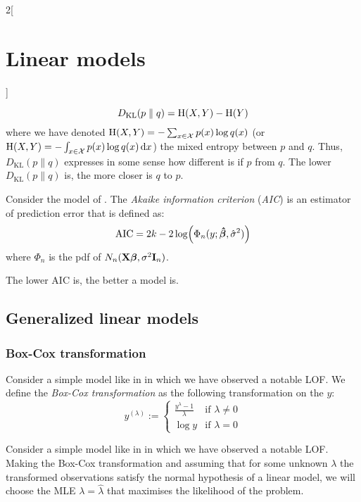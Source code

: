 \documentclass[../../../main_math.tex]{subfiles}
\begin{document}
\begin{multicols}{2}[\section{Linear models}]
\begin{remark}
    $$D_{\mathrm{KL}}(p\parallel q)=\mathrm{H}(X,Y)-\mathrm{H}(Y)$$
    where we have denoted $\mathrm{H}(X, Y) = -\sum_{x\in\mathcal{X}}p(x)\log q(x)$ (or $\mathrm{H}(X, Y) = -\int_{x\in\mathcal{X}}p(x)\log q(x)\dd{x}$) the mixed entropy between $p$ and $q$. Thus, $D_{\mathrm{KL}}(p\parallel q)$ expresses in some sense how different is if $p$ from $q$. The lower $D_{\mathrm{KL}}(p\parallel q)$ is, the more closer is $q$ to $p$.
  \end{remark}
  \begin{definition}
    Consider the model of . The \emph{Akaike information criterion} (\emph{AIC}) is an estimator of prediction error that is defined as: $$\mathrm{AIC}=2k-2\log(\Phi_n(y;\boldsymbol{\mathrm{\hat\beta}},\hat\sigma^2))$$
    where $\Phi_n$ is the pdf of $N_n(\boldsymbol{\mathrm{X\beta}},\sigma^2\boldsymbol{\mathrm{I}}_n)$.
  \end{definition}
  \begin{remark}
    The lower $\mathrm{AIC}$ is, the better a model is.
  \end{remark}
  \subsection{Generalized linear models}
  \subsubsection{Box-Cox transformation}
  \begin{definition}
    Consider a simple model like in  in which we have observed a notable LOF. We define the \emph{Box-Cox transformation} as the following transformation on the $y$:
    $$
      y^{(\lambda)}:=\begin{cases}
        \displaystyle\frac{y^\lambda-1}{\lambda} & \text{if $\lambda\ne 0$} \\
        \log y                                   & \text{if $\lambda= 0$}
      \end{cases}
    $$
  \end{definition}
  \begin{proposition}
    Consider a simple model like in  in which we have observed a notable LOF. Making the Box-Cox transformation and assuming that for some unknown $\lambda$ the transformed observations satisfy the normal hypothesis of a linear model, we will choose the MLE $\lambda=\hat\lambda$ that maximises the likelihood of the problem.
  \end{proposition}

\end{multicols}
\end{document}
